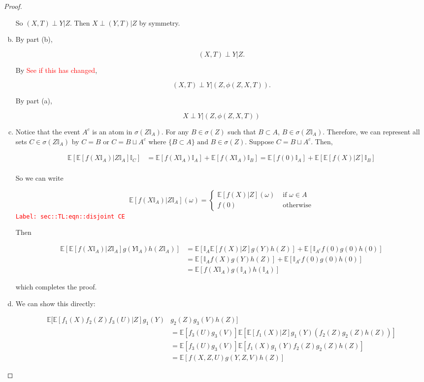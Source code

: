 \documentclass[12pt]{article}
\newcommand{\mb}{\mathbb}
\newcommand{\te}{\text}
\newcommand{\tr}{\textcolor{red}}
\newcommand{\labe}[1]{\tr{\texttt{Label: #1}}}
\newcommand{\ex}[1]{\mb{E}\left[#1\right]}			%
\begin{document}
\begin{proof}
\begin{enumerate}[(a)]
So \((X,T)\perp Y|Z\). Then \(X\perp (Y,T)|Z\) by symmetry.

\item By part (b), 

\[(X,T)\perp Y|Z.\]

By \cite[Lemma 2.10]{RamCur} \tr{See if this has changed}, 

\[(X,T)\perp Y|(Z,\phi(Z,X,T)).\]

By part (a),

\[X\perp Y|(Z,\phi(Z,X,T))\]

\item Notice that the event \(A^c\) is an atom in \(\sigma(Z\mb{I}_A)\). For any \(B \in \sigma(Z)\) such that \(B\subset A\), \(B \in \sigma(Z\mb{I}_A)\). Therefore, we can represent all sets \(C \in \sigma(Z\mb{I}_A)\) by \(C = B\) or \(C = B\sqcup A^c\) where \(\{B\subset A\}\te{ and } B \in \sigma(Z)\). Suppose \(C = B\sqcup A^c\). Then,

\begin{align*}
\ex{\ex{f(X\mb{I}_A)|Z\mb{I}_A}\mb{I}_C} &= \ex{f(X\mb{I}_A)\mb{I}_A}+\ex{f(X\mb{I}_A)\mb{I}_B} = \ex{f(0)\mb{I}_A} + \ex{\ex{f(X)|Z}\mb{I}_B}\\
\end{align*}

So we can write

\begin{equation}
\ex{f(X\mb{I}_A)|Z\mb{I}_A}(\omega) = \begin{cases}
\ex{f(X)|Z}(\omega) &\te{ if } \omega \in A\\
f(0) &\te{ otherwise}
\end{cases}
\label{sec::TL:eqn::disjoint CE}
\end{equation}
\labe{sec::TL:eqn::disjoint CE}

Then

\begin{align*}
\ex{\ex{f(X\mb{I}_A)|Z\mb{I}_A}g(Y\mb{I}_A)h(Z\mb{I}_A)} &= \ex{\mb{I}_A\ex{f(X)|Z}g(Y)h(Z)} + \ex{\mb{I}_{A^c}f(0)g(0)h(0)}\\
&=\ex{\mb{I}_Af(X)g(Y)h(Z)}+\ex{\mb{I}_{A^c}f(0)g(0)h(0)}\\
&= \ex{f(X\mb{I}_A)g(\mb{I}_A)h(\mb{I}_A)}
\end{align*}

which completes the proof.

\item We can show this directly:

\begin{align*}
\mb{E}\bigg[\ex{f_1(X)f_2(Z)f_3(U)|Z}g_1(Y)&g_2(Z)g_3(V)h(Z)\bigg]\\
&= \ex{f_3(U)g_3(V)}\ex{\ex{f_1(X)|Z}g_1(Y)(f_2(Z)g_2(Z)h(Z))}\\
&= \ex{f_3(U)g_3(V)}\ex{f_1(X)g_1(Y)f_2(Z)g_2(Z)h(Z)}\\
&= \ex{f(X,Z,U)g(Y,Z,V)h(Z)}
\end{align*}


\end{enumerate}
\end{proof}
\end{document}
